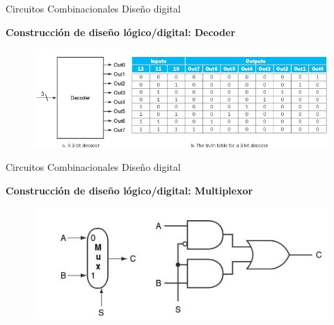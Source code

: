 \documentclass[aspectratio=169,compress]{beamer}
\begin{document}
\begin{footnotesize}
\begin{frame} {Circuitos Combinacionales} {Diseño digital}
\begin{center}\textbf{Construcción de diseño lógico/digital: Decoder}\end{center}
\begin{figure}
\includegraphics[scale=0.4]{images/decoder.jpg} 
\end{figure}
\end{frame}


\begin{frame} {Circuitos Combinacionales} {Diseño digital}
\begin{center}\textbf{Construcción de diseño lógico/digital: Multiplexor}\end{center}
\begin{figure}
\includegraphics[scale=0.4]{images/multiplexor.jpg} 
\end{figure}
\end{frame}




\end{footnotesize}
\end{document}
